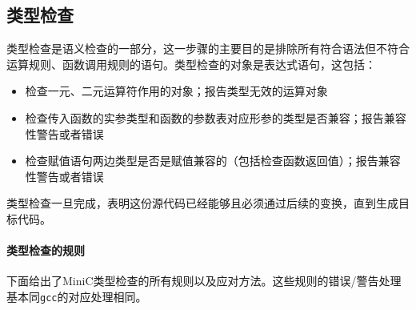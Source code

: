 \subsection{类型检查}
\label{typeveri}
类型检查是语义检查的一部分，这一步骤的主要目的是排除所有符合语法但不符合运算规则、函数调用规则的语句。类型检查的对象是表达式语句，这包括：
\begin{itemize}
	\item 检查一元、二元运算符作用的对象；报告类型无效的运算对象
	\item 检查传入函数的实参类型和函数的参数表对应形参的类型是否兼容；报告兼容性警告或者错误
	\item 检查赋值语句两边类型是否是赋值兼容的（包括检查函数返回值）；报告兼容性警告或者错误
\end{itemize}
类型检查一旦完成，表明这份源代码已经能够且必须通过后续的变换，直到生成目标代码。
\paragraph*{类型检查的规则} 下面给出了MiniC类型检查的所有规则以及应对方法。这些规则的错误/警告处理基本同\verb|gcc|的对应处理相同。

